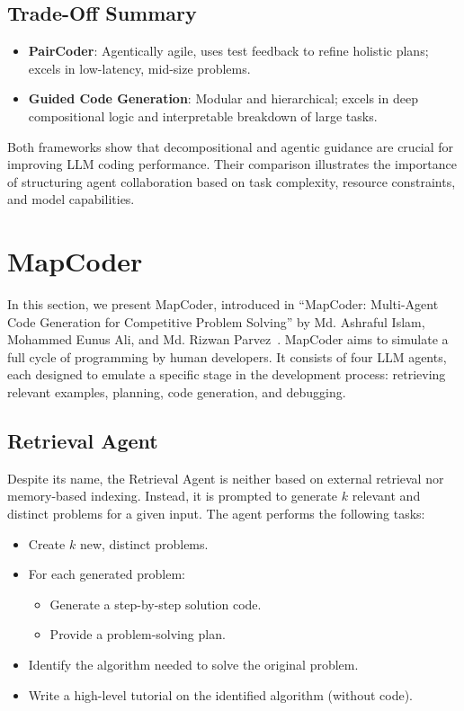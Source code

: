 \documentclass[11pt,a4paper]{article}
\begin{document}
\subsection{Trade-Off Summary}
\begin{itemize}
\item \textbf{PairCoder}: Agentically agile, uses test feedback to refine holistic plans; excels in low-latency, mid-size problems.
\item \textbf{Guided Code Generation}: Modular and hierarchical; excels in deep compositional logic and interpretable breakdown of large tasks.
\end{itemize}

Both frameworks show that decompositional and agentic guidance are crucial for improving LLM coding performance. Their comparison illustrates the importance of structuring agent collaboration based on task complexity, resource constraints, and model capabilities.

\section{MapCoder}

In this section, we present MapCoder, introduced in ``MapCoder: Multi-Agent Code Generation for Competitive Problem Solving'' by Md. Ashraful Islam, Mohammed Eunus Ali, and Md. Rizwan Parvez~\cite{islam2024mapcodermultiagentcodegeneration}. MapCoder aims to simulate a full cycle of programming by human developers. It consists of four LLM agents, each designed to emulate a specific stage in the development process: retrieving relevant examples, planning, code generation, and debugging.

\subsection{Retrieval Agent}
Despite its name, the Retrieval Agent is neither based on external retrieval nor memory-based indexing. Instead, it is prompted to generate $k$ relevant and distinct problems for a given input. The agent performs the following tasks:

\begin{itemize}
  \item Create $k$ new, distinct problems.
  \item For each generated problem:
  \begin{itemize}
    \item Generate a step-by-step solution code.
    \item Provide a problem-solving plan.
  \end{itemize}
  \item Identify the algorithm needed to solve the original problem.
  \item Write a high-level tutorial on the identified algorithm (without code).
\end{itemize}
\end{document}
